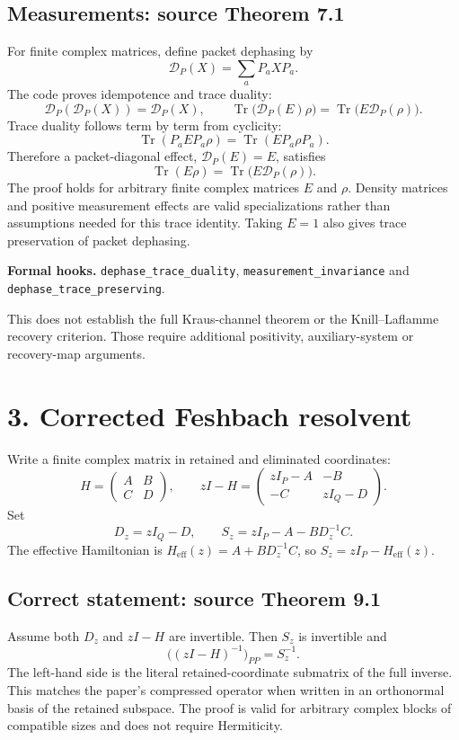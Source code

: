 \documentclass[11pt]{article}
\newcommand{\C}{\mathbb C}
\newcommand{\tr}{\operatorname{Tr}}
\newcommand{\deph}{\mathcal D_P}
\newcommand{\code}[1]{{\small\nolinkurl{#1}}}
\begin{document}
\subsection*{Measurements: source Theorem 7.1}
For finite complex matrices, define packet dephasing by
\[
\deph(X)=\sum_aP_aXP_a.
\]
The code proves idempotence and trace duality:
\[
\deph(\deph(X))=\deph(X),\qquad
\tr\bigl(\deph(E)\rho\bigr)=\tr\bigl(E\deph(\rho)\bigr).
\]
Trace duality follows term by term from cyclicity:
\[
\tr(P_aEP_a\rho)=\tr(EP_a\rho P_a).
\]
Therefore a packet-diagonal effect, $\deph(E)=E$, satisfies
\[
\boxed{\tr(E\rho)=\tr\bigl(E\deph(\rho)\bigr).}
\]
The proof holds for arbitrary finite complex matrices $E$ and $\rho$. Density matrices and positive measurement effects are valid specializations rather than assumptions needed for this trace identity. Taking $E=1$ also gives trace preservation of packet dephasing.

\textbf{Formal hooks.} \code{dephase_trace_duality},
\code{measurement_invariance} and \code{dephase_trace_preserving}.

This does not establish the full Kraus-channel theorem or the Knill--Laflamme recovery criterion. Those require additional positivity, auxiliary-system or recovery-map arguments.

\clearpage
\section*{3. Corrected Feshbach resolvent}
Write a finite complex matrix in retained and eliminated coordinates:
\[
H=\begin{pmatrix}A&B\\C&D\end{pmatrix},\qquad
zI-H=\begin{pmatrix}zI_P-A&-B\\-C&zI_Q-D\end{pmatrix}.
\]
Set
\[
D_z=zI_Q-D,\qquad S_z=zI_P-A-BD_z^{-1}C.
\]
The effective Hamiltonian is $H_{\mathrm{eff}}(z)=A+BD_z^{-1}C$, so
$S_z=zI_P-H_{\mathrm{eff}}(z)$.

\subsection*{Correct statement: source Theorem 9.1}
Assume both $D_z$ and $zI-H$ are invertible. Then $S_z$ is invertible and
\[
\boxed{\bigl((zI-H)^{-1}\bigr)_{PP}=S_z^{-1}.}
\]
The left-hand side is the literal retained-coordinate submatrix of the full inverse. This matches the paper's compressed operator when written in an orthonormal basis of the retained subspace. The proof is valid for arbitrary complex blocks of compatible sizes and does not require Hermiticity.
\end{document}
